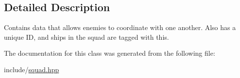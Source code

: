 \subsection{Detailed Description}
Contains data that allows enemies to coordinate with one another. Also has a unique I\-D, and ships in the squad are tagged with this. 

The documentation for this class was generated from the following file\-:\begin{DoxyCompactItemize}
\item 
include/\hyperlink{squad_8hpp}{squad.\-hpp}\end{DoxyCompactItemize}
